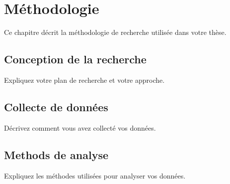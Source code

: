 \chapter{Méthodologie}
\label{ch:methodology}

Ce chapitre décrit la méthodologie de recherche utilisée dans votre thèse.

\section{Conception de la recherche}

Expliquez votre plan de recherche et votre approche.

\section{Collecte de données}

Décrivez comment vous avez collecté vos données.

\section{Methods de analyse}

Expliquez les méthodes utilisées pour analyser vos données.
